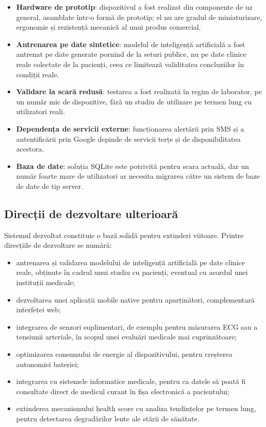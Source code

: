 \documentclass[12pt,a4paper]{article}
\begin{document}
\begin{itemize}[leftmargin=1.5em]
\item \textbf{Hardware de prototip}: dispozitivul a fost realizat din componente de uz general, asamblate într-o formă de prototip; el nu are gradul de miniaturizare, ergonomie și rezistență mecanică al unui produs comercial.
\item \textbf{Antrenarea pe date sintetice}: modelul de inteligență artificială a fost antrenat pe date generate pornind de la seturi publice, nu pe date clinice reale colectate de la pacienți, ceea ce limitează validitatea concluziilor în condiții reale.
\item \textbf{Validare la scară redusă}: testarea a fost realizată în regim de laborator, pe un număr mic de dispozitive, fără un studiu de utilizare pe termen lung cu utilizatori reali.
\item \textbf{Dependența de servicii externe}: funcționarea alertării prin SMS și a autentificării prin Google depinde de servicii terțe și de disponibilitatea acestora.
\item \textbf{Baza de date}: soluția SQLite este potrivită pentru scara actuală, dar un număr foarte mare de utilizatori ar necesita migrarea către un sistem de baze de date de tip server.
\end{itemize}

\subsection{Direcții de dezvoltare ulterioară}

Sistemul dezvoltat constituie o bază solidă pentru extinderi viitoare. Printre direcțiile de dezvoltare se numără:

\begin{itemize}[leftmargin=1.5em]
\item antrenarea și validarea modelului de inteligență artificială pe date clinice reale, obținute în cadrul unui studiu cu pacienți, eventual cu acordul unei instituții medicale;
\item dezvoltarea unei aplicații mobile native pentru aparținători, complementară interfeței web;
\item integrarea de senzori suplimentari, de exemplu pentru măsurarea ECG sau a tensiunii arteriale, în scopul unei evaluări medicale mai cuprinzătoare;
\item optimizarea consumului de energie al dispozitivului, pentru creșterea autonomiei bateriei;
\item integrarea cu sistemele informatice medicale, pentru ca datele să poată fi consultate direct de medicul curant în fișa electronică a pacientului;
\item extinderea mecanismului health score cu analiza tendințelor pe termen lung, pentru detectarea degradărilor lente ale stării de sănătate.
\end{itemize}
\end{document}
